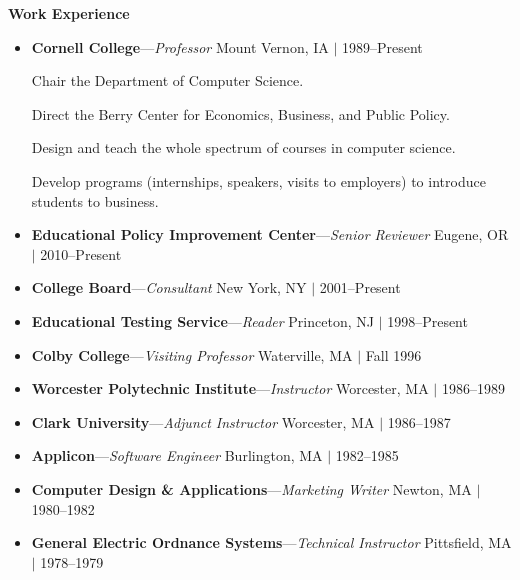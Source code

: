 \documentclass[twoside,10pt]{article}
\newcommand{\mycategory}[1]{{\color{mycategorycolor}\large \textbf{#1}}}
\newcommand{\mywork}[4]{\textbf{#1}---\emph{#2} \hfill #3 $\mid$ #4}
\begin{document}

\mycategory{Work Experience}

\begin{itemize}[label={$\triangleright$}] \itemsep1pt \parskip3pt 
  \item \mywork{Cornell College}{Professor}{Mount Vernon, IA}{1989--Present}

    Chair the Department of Computer Science.

    Direct the Berry Center for Economics, Business, and Public Policy.

    Design and teach the whole spectrum of courses in
    computer science.

    Develop programs (internships, speakers, visits to employers) to introduce students to business.


  \item \mywork{Educational Policy Improvement Center}{Senior Reviewer}{Eugene, OR}{2010--Present}
  \item \mywork{College Board}{Consultant}{New York, NY}{2001--Present}
  \item \mywork{Educational Testing Service}{Reader}{Princeton, NJ}{1998--Present}
  \item \mywork{Colby College}{Visiting Professor}{Waterville, MA}{Fall 1996}
  \item \mywork{Worcester Polytechnic Institute}{Instructor}{Worcester, MA}{1986--1989}
  \item \mywork{Clark University}{Adjunct Instructor}{Worcester, MA}{1986--1987}
  \item \mywork{Applicon}{Software Engineer}{Burlington, MA}{1982--1985}
  \item \mywork{Computer Design \& Applications}{Marketing Writer}{Newton, MA}{1980--1982}
  \item \mywork{General Electric Ordnance Systems}{Technical Instructor}{Pittsfield, MA}{1978--1979}
  \end{itemize}
\end{document}
